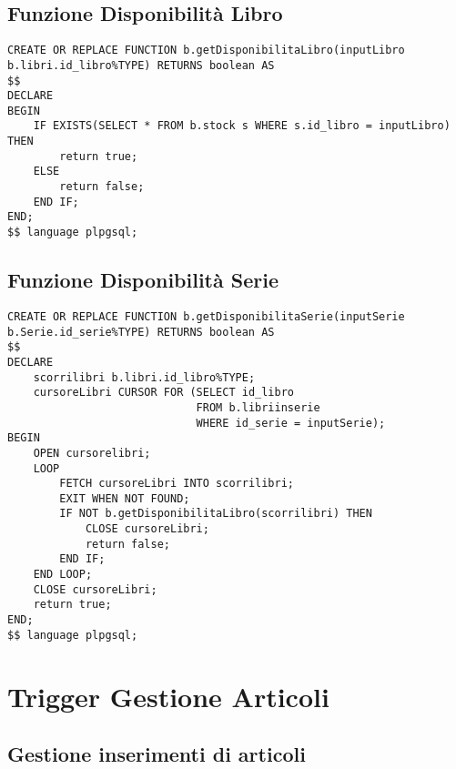 \subsection{Funzione Disponibilit\`a Libro}
\begin{lstlisting}
CREATE OR REPLACE FUNCTION b.getDisponibilitaLibro(inputLibro b.libri.id_libro%TYPE) RETURNS boolean AS
$$
DECLARE
BEGIN
    IF EXISTS(SELECT * FROM b.stock s WHERE s.id_libro = inputLibro) THEN
        return true;
    ELSE
        return false;
    END IF;
END;
$$ language plpgsql;
\end{lstlisting}

\subsection{Funzione Disponibilit\`a Serie}
\begin{lstlisting}
CREATE OR REPLACE FUNCTION b.getDisponibilitaSerie(inputSerie b.Serie.id_serie%TYPE) RETURNS boolean AS
$$
DECLARE
    scorrilibri b.libri.id_libro%TYPE;
    cursoreLibri CURSOR FOR (SELECT id_libro
                             FROM b.libriinserie
                             WHERE id_serie = inputSerie);
BEGIN
    OPEN cursorelibri;
    LOOP
        FETCH cursoreLibri INTO scorrilibri;
        EXIT WHEN NOT FOUND;
        IF NOT b.getDisponibilitaLibro(scorrilibri) THEN
            CLOSE cursoreLibri;
            return false;
        END IF;
    END LOOP;
    CLOSE cursoreLibri;
    return true;
END;
$$ language plpgsql;
\end{lstlisting}

\section{Trigger Gestione Articoli}
\subsection{Gestione inserimenti di articoli}

